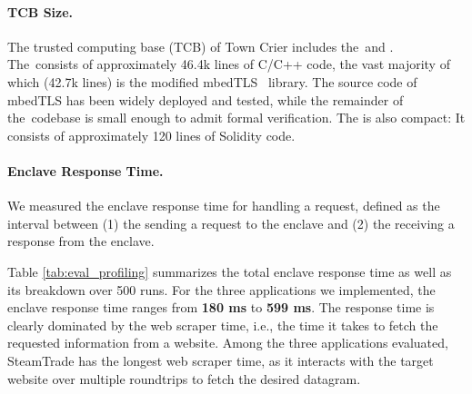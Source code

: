 \paragraph{TCB Size.}
The trusted computing base (TCB) of Town Crier includes the~\encname and \tcontract. The~\encname consists of approximately 46.4k
lines of C/C++ code, the vast majority of which (42.7k lines) is the modified mbedTLS~\cite{mbedtls}
library. The source code of mbedTLS has been widely deployed and tested, while the
remainder of the~\encname codebase is small enough to admit formal verification.
The \tcontract is also compact: It consists of approximately 120 lines of Solidity code.

\paragraph{Enclave Response Time.}
\label{subsec:response time}
We measured the enclave response time for handling a \tc request, defined as the interval between (1)  
the \medname sending a request to the enclave 
and (2) the \medname receiving a response from the enclave. 

Table \ref{tab:eval_profiling} summarizes the total enclave response time as
well as its breakdown over 500 runs.  For the three applications we
implemented, the enclave response time ranges from {\bf 180 ms} to {\bf 599 ms}.
The response time is clearly dominated by the web scraper time, i.e., the time
it takes to fetch the requested information from a website.  Among the three
applications evaluated, {\sf SteamTrade} has the longest web scraper time, as it interacts with the target website
over multiple roundtrips to fetch the desired datagram.


